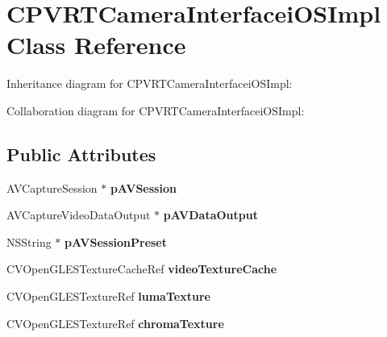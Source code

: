 \hypertarget{interface_c_p_v_r_t_camera_interfacei_o_s_impl}{\section{C\+P\+V\+R\+T\+Camera\+Interfacei\+O\+S\+Impl Class Reference}
\label{interface_c_p_v_r_t_camera_interfacei_o_s_impl}
}


Inheritance diagram for C\+P\+V\+R\+T\+Camera\+Interfacei\+O\+S\+Impl\+:


Collaboration diagram for C\+P\+V\+R\+T\+Camera\+Interfacei\+O\+S\+Impl\+:
\subsection*{Public Attributes}
\begin{DoxyCompactItemize}
\item 
\hypertarget{interface_c_p_v_r_t_camera_interfacei_o_s_impl_a856041b4b1f85caf55b001febdd2a3c8}{A\+V\+Capture\+Session $\ast$ {\bfseries p\+A\+V\+Session}}\label{interface_c_p_v_r_t_camera_interfacei_o_s_impl_a856041b4b1f85caf55b001febdd2a3c8}

\item 
\hypertarget{interface_c_p_v_r_t_camera_interfacei_o_s_impl_ada38a7e07ee29cb2ddcf9c40dc9be5c1}{A\+V\+Capture\+Video\+Data\+Output $\ast$ {\bfseries p\+A\+V\+Data\+Output}}\label{interface_c_p_v_r_t_camera_interfacei_o_s_impl_ada38a7e07ee29cb2ddcf9c40dc9be5c1}

\item 
\hypertarget{interface_c_p_v_r_t_camera_interfacei_o_s_impl_a7ec3a324c13ddf3e31529546165fb3b2}{N\+S\+String $\ast$ {\bfseries p\+A\+V\+Session\+Preset}}\label{interface_c_p_v_r_t_camera_interfacei_o_s_impl_a7ec3a324c13ddf3e31529546165fb3b2}

\item 
\hypertarget{interface_c_p_v_r_t_camera_interfacei_o_s_impl_addb30bd99cc6f4236b6e3c08cf13dea1}{C\+V\+Open\+G\+L\+E\+S\+Texture\+Cache\+Ref {\bfseries video\+Texture\+Cache}}\label{interface_c_p_v_r_t_camera_interfacei_o_s_impl_addb30bd99cc6f4236b6e3c08cf13dea1}

\item 
\hypertarget{interface_c_p_v_r_t_camera_interfacei_o_s_impl_a9aa192aa49601e255b6807fb90dcbd61}{C\+V\+Open\+G\+L\+E\+S\+Texture\+Ref {\bfseries luma\+Texture}}\label{interface_c_p_v_r_t_camera_interfacei_o_s_impl_a9aa192aa49601e255b6807fb90dcbd61}

\item 
\hypertarget{interface_c_p_v_r_t_camera_interfacei_o_s_impl_a38654e17f3c65e97f2d1b87f8a6091f7}{C\+V\+Open\+G\+L\+E\+S\+Texture\+Ref {\bfseries chroma\+Texture}}\label{interface_c_p_v_r_t_camera_interfacei_o_s_impl_a38654e17f3c65e97f2d1b87f8a6091f7}

\end{DoxyCompactItemize}


